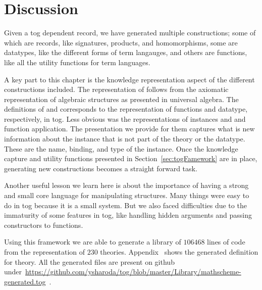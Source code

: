

\section{Discussion}
Given a tog dependent record, we have generated multiple constructions; some of which are records, like signatures, products, and homomorphisms, some are datatypes, like the different forms of term langauges, and others are functions, like all the utility functions for term languages. 

A key part to this chapter is the knowledge representation aspect of the different constructions included. The representation of  follows from the axiomatic representation of algebraic structures as presented in universal algebra. The definitions of  and  corresponds to the representation of functions and datatype, respectively, in tog. Less obvious was the representations of instances  and  and function application. The presentation we provide for them captures what is new information about the instance that is not part of the theory or the datatype. These are the name, binding, and type of the instance. 
Once the knowledge capture and utility functions presented in Section~\ref{sec:togFamework} are in place, generating new constructions becomes a straight forward task. 

Another useful lesson we learn here is about the importance of having a strong and small core language for manipulating structures. Many things were easy to do in tog because it is a small system. But we also faced difficulties due to the immaturity of some features in tog, like handling hidden arguments and passing constructors to functions. 

Using this framework we are able to generate a library of $106468$ lines of code from the representation of $230$ theories. Appendix~ shows the generated definition for  theory. All the generated files are present on github under~\url{https://github.com/ysharoda/tog/blob/master/Library/mathscheme-generated.tog}~. 
 
